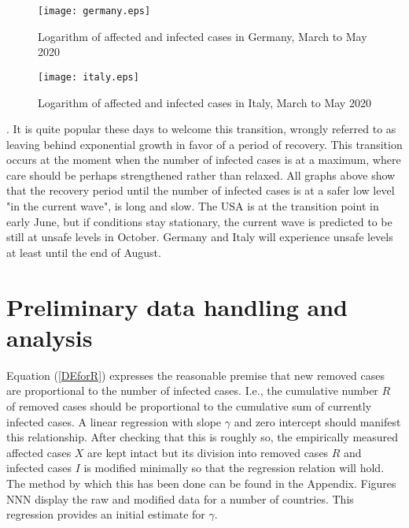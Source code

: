 \documentclass{article}
\begin{document}
\begin{figure}
\begin{center}
{\texttt{[image: germany.eps]}}
\end{center}
\caption{Logarithm of affected and infected cases in Germany, March to May 2020}
\label{germany}
\end{figure}

\begin{figure}
\begin{center}
{\texttt{[image: italy.eps]}}
\end{center}
\caption{Logarithm of affected and infected cases in Italy, March to May 2020}
\label{italy}
\end{figure}

. It is quite popular these days to welcome this transition, wrongly referred to as leaving behind exponential growth in favor of a period of recovery. This transition occurs at the moment when the number of infected cases is at a maximum, where care should be perhaps strengthened rather than relaxed. All graphs above show that the recovery period until the number of infected cases is at a safer low level "in the current wave", is long and slow.  The USA is at the transition point in early June, but if conditions stay stationary, the current wave is predicted to be still at unsafe levels in October. Germany and Italy will experience unsafe levels at least until the end of August.

\section{Preliminary data handling and analysis} \label{preliminarysection}

Equation (\ref{DEforR}) expresses the reasonable premise that new removed cases are proportional to the number of infected cases. I.e., the cumulative number $R$ of removed cases should be proportional to the cumulative sum of currently infected cases. A linear regression with slope $\gamma$ and zero intercept should manifest this relationship. After checking that this is roughly so, the empirically measured affected cases $X$ are kept intact but its division into removed cases $R$ and infected cases $I$ is modified minimally so that the regression relation will hold. The method by which this has been done can be found in the Appendix. Figures NNN display the raw and modified data for a number of countries. This regression provides an initial estimate for $\gamma$.
\end{document}
